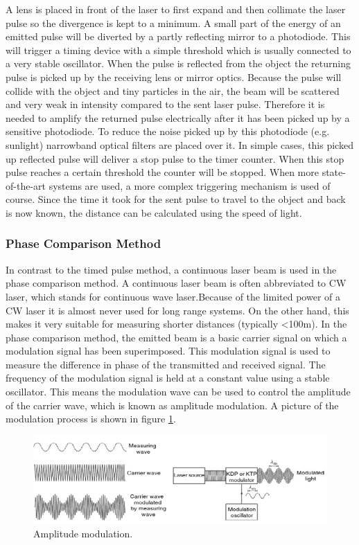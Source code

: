 \documentclass{article}
\begin{document}
A lens is placed in front of the laser to first expand and then collimate the laser pulse so the divergence is kept to a minimum. A small part of the energy of an emitted pulse will be diverted by a partly reflecting mirror to a photodiode. This will trigger a timing device with a simple threshold which is usually connected to a very stable oscillator. When the pulse is reflected from the object the returning pulse is picked up by the receiving lens or mirror optics. Because the pulse will collide with the object and tiny particles in the air, the beam will be scattered and very weak in intensity compared to the sent laser pulse. Therefore it is needed to amplify the returned pulse electrically after it has been picked up by a sensitive photodiode. To reduce the noise picked up by this photodiode (e.g. sunlight) 
narrowband optical filters are placed over it. In simple cases, this picked up reflected pulse will deliver a stop pulse to the timer counter. When this stop pulse reaches a certain threshold the counter will be stopped. When more state-of-the-art systems are used, a more complex triggering mechanism is used of course. Since the time it took for the sent pulse to travel to the object and back is now known, the distance can be calculated using the speed of light.

\subsubsection{Phase Comparison Method}

In contrast to the timed pulse method, a continuous laser beam is used in the phase comparison method. A continuous laser beam is often abbreviated to CW laser, which stands for continuous wave laser.Because of the limited power of a CW laser it is almost never used for long range systems. On the other hand, this makes it very suitable for measuring shorter distances (typically \textless 100m). In the phase comparison method, the emitted beam is a basic carrier signal on which a modulation signal has been superimposed. This modulation signal is used to measure the difference in phase of the transmitted and received signal. The frequency of the modulation signal is held at a constant value using a stable oscillator. This means the modulation wave can be used to control the amplitude of the carrier wave, which is known as amplitude modulation. A picture of the modulation process is shown in figure \ref{lidar2}. 


\begin{figure}[H]
	\centering
	\includegraphics[scale=1]{figures/Modulation}
	\caption{Amplitude modulation. }
	\label{lidar2}
\end{figure}
\end{document}
